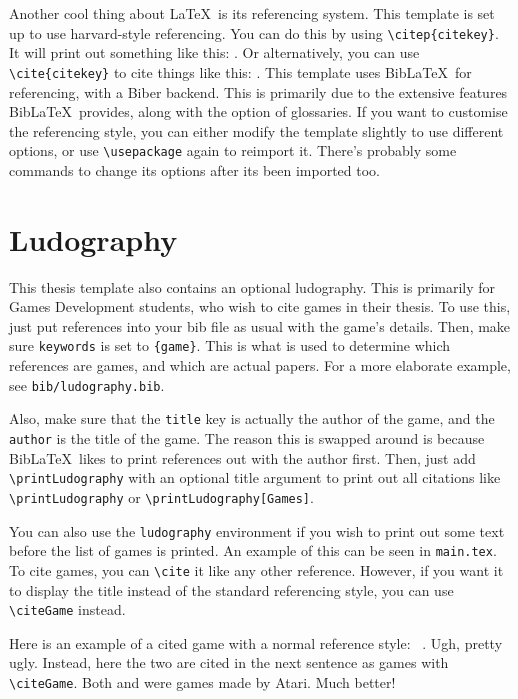 Another cool thing about \LaTeX~is its referencing system. This template is set up to use harvard-style referencing. You can do this by using \texttt{\textbackslash citep\{citekey\}}. It will print out something like this: \citep{aad2012observation}. Or alternatively, you can use \texttt{\textbackslash cite\{citekey\}} to cite things like this: \cite{chatrchyan2012observation}. This template uses Bib\LaTeX~for referencing, with a Biber backend. This is primarily due to the extensive features Bib\LaTeX~provides, along with the option of glossaries. If you want to customise the referencing style, you can either modify the template slightly to use different options, or use \texttt{\textbackslash usepackage} again to reimport it. There's probably some commands to change its options after its been imported too.

\section{Ludography}
This thesis template also contains an optional ludography. This is primarily for Games Development students, who wish to cite games in their thesis. To use this, just put references into your bib file as usual with the game's details. Then, make sure \texttt{keywords} is set to \texttt{\{game\}}. This is what is used to determine which references are games, and which are actual papers. For a more elaborate example, see \texttt{bib/ludography.bib}.

Also, make sure that the \texttt{title} key is actually the author of the game, and the \texttt{author} is the title of the game. The reason this is swapped around is because Bib\LaTeX~likes to print references out with the author first. Then, just add \texttt{\textbackslash printLudography} with an optional title argument to print out all citations like \texttt{\textbackslash printLudography} or \texttt{\textbackslash printLudography[Games]}.

You can also use the \texttt{ludography} environment if you wish to print out some text before the list of games is printed. An example of this can be seen in \texttt{main.tex}. To cite games, you can \texttt{\textbackslash cite} it like any other reference. However, if you want it to display the title instead of the standard referencing style, you can use \texttt{\textbackslash citeGame} instead.

Here is an example of a cited game with a normal reference style: ~\cite{spaceinvaders}. Ugh, pretty ugly. Instead, here the two are  cited in the next sentence as games with \texttt{\textbackslash citeGame}. Both  and  were games made by Atari. Much better!

